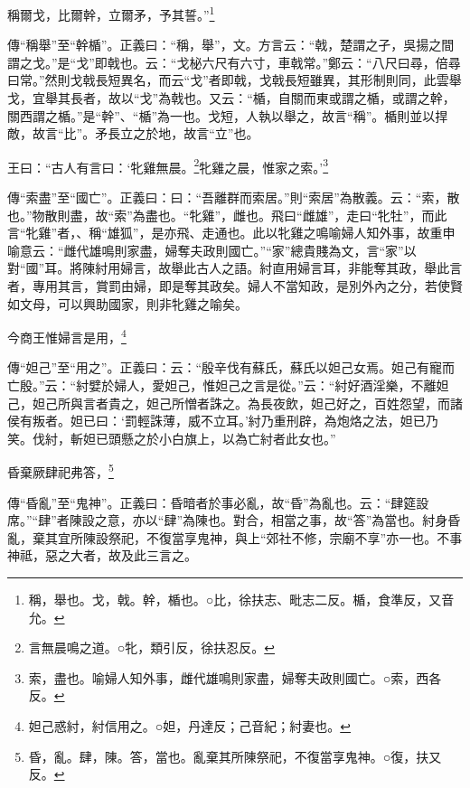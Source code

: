稱爾戈，比爾幹，立爾矛，予其誓。”\footnote{稱，舉也。戈，戟。幹，楯也。○比，徐扶志、毗志二反。楯，食準反，又音允。}

{\noindent\zhuan{}\fzbyks 傳“稱舉”至“幹楯”。正義曰：“稱，舉”，文。方言云：“戟，楚謂之孑，吳揚之間謂之戈。”是“戈”即戟也。云：“戈柲六尺有六寸，車戟常。”鄭云：“八尺曰尋，倍尋曰常。”然則戈戟長短異名，而云“戈”者即戟，戈戟長短雖異，其形制則同，此雲舉戈，宜舉其長者，故以“戈”為戟也。又云：“楯，自關而東或謂之楯，或謂之幹，關西謂之楯。”是“幹”、“楯”為一也。戈短，人執以舉之，故言“稱”。楯則並以捍敵，故言“比”。矛長立之於地，故言“立”也。 \par}

王曰：“古人有言曰：‘牝雞無晨。\footnote{言無晨鳴之道。○牝，類引反，徐扶忍反。}牝雞之晨，惟家之索。’\footnote{索，盡也。喻婦人知外事，雌代雄鳴則家盡，婦奪夫政則國亡。○索，西各反。}

{\noindent\zhuan{}\fzbyks 傳“索盡”至“國亡”。正義曰：曰：“吾離群而索居。”則“索居”為散義。云：“索，散也。”物散則盡，故“索”為盡也。“牝雞”，雌也。飛曰“雌雄”，走曰“牝牡”，而此言“牝雞”者，、稱“雄狐”，是亦飛、走通也。此以牝雞之鳴喻婦人知外事，故重申喻意云：“雌代雄鳴則家盡，婦奪夫政則國亡。”“家”總貴賤為文，言“家”以對“國”耳。將陳紂用婦言，故舉此古人之語。紂直用婦言耳，非能奪其政，舉此言者，專用其言，賞罰由婦，即是奪其政矣。婦人不當知政，是別外內之分，若使賢如文母，可以興助國家，則非牝雞之喻矣。 \par}

今商王惟婦言是用，\footnote{妲己惑紂，紂信用之。○妲，丹達反；己音紀；紂妻也。}

{\noindent\zhuan{}\fzbyks 傳“妲己”至“用之”。正義曰：云：“殷辛伐有蘇氏，蘇氏以妲己女焉。妲己有寵而亡殷。”云：“紂嬖於婦人，愛妲己，惟妲己之言是從。”云：“紂好酒淫樂，不離妲己，妲己所與言者貴之，妲己所憎者誅之。為長夜飲，妲己好之，百姓怨望，而諸侯有叛者。妲已曰：‘罰輕誅薄，威不立耳。’紂乃重刑辟，為炮烙之法，妲已乃笑。伐紂，斬妲已頭懸之於小白旗上，以為亡紂者此女也。” \par}

昏棄厥肆祀弗答，\footnote{昏，亂。肆，陳。答，當也。亂棄其所陳祭祀，不復當享鬼神。○復，扶又反。}

{\noindent\zhuan{}\fzbyks 傳“昏亂”至“鬼神”。正義曰：昏暗者於事必亂，故“昏”為亂也。云：“肆筵設席。”“肆”者陳設之意，亦以“肆”為陳也。對合，相當之事，故“答”為當也。紂身昏亂，棄其宜所陳設祭祀，不復當享鬼神，與上“郊社不修，宗廟不享”亦一也。不事神祗，惡之大者，故及此三言之。 \par}

